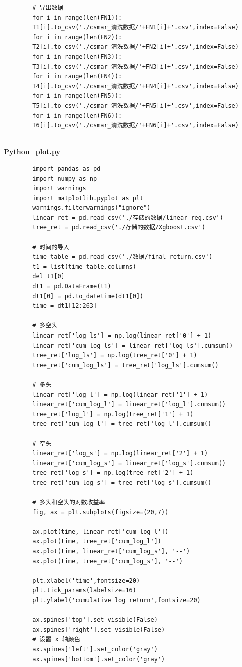 \documentclass[12pt]{article} %
\begin{document}
\begin{lstlisting}
		# 导出数据
		for i in range(len(FN1)):
		T1[i].to_csv('./csmar_清洗数据/'+FN1[i]+'.csv',index=False)
		for i in range(len(FN2)):
		T2[i].to_csv('./csmar_清洗数据/'+FN2[i]+'.csv',index=False)
		for i in range(len(FN3)):
		T3[i].to_csv('./csmar_清洗数据/'+FN3[i]+'.csv',index=False)
		for i in range(len(FN4)):
		T4[i].to_csv('./csmar_清洗数据/'+FN4[i]+'.csv',index=False)
		for i in range(len(FN5)):
		T5[i].to_csv('./csmar_清洗数据/'+FN5[i]+'.csv',index=False)
		for i in range(len(FN6)):
		T6[i].to_csv('./csmar_清洗数据/'+FN6[i]+'.csv',index=False)
	\end{lstlisting}
	~\\
	\textbf{Python\_plot.py}
	\begin{lstlisting}
		import pandas as pd
		import numpy as np
		import warnings
		import matplotlib.pyplot as plt
		warnings.filterwarnings("ignore")
		linear_ret = pd.read_csv('./存储的数据/linear_reg.csv')
		tree_ret = pd.read_csv('./存储的数据/Xgboost.csv')
		
		# 时间的导入
		time_table = pd.read_csv('./数据/final_return.csv')
		t1 = list(time_table.columns)
		del t1[0]
		dt1 = pd.DataFrame(t1)
		dt1[0] = pd.to_datetime(dt1[0])
		time = dt1[12:263]
		
		# 多空头
		linear_ret['log_ls'] = np.log(linear_ret['0'] + 1)
		linear_ret['cum_log_ls'] = linear_ret['log_ls'].cumsum()
		tree_ret['log_ls'] = np.log(tree_ret['0'] + 1)
		tree_ret['cum_log_ls'] = tree_ret['log_ls'].cumsum()
		
		# 多头
		linear_ret['log_l'] = np.log(linear_ret['1'] + 1)
		linear_ret['cum_log_l'] = linear_ret['log_l'].cumsum()
		tree_ret['log_l'] = np.log(tree_ret['1'] + 1)
		tree_ret['cum_log_l'] = tree_ret['log_l'].cumsum()
		
		# 空头
		linear_ret['log_s'] = np.log(linear_ret['2'] + 1)
		linear_ret['cum_log_s'] = linear_ret['log_s'].cumsum()
		tree_ret['log_s'] = np.log(tree_ret['2'] + 1)
		tree_ret['cum_log_s'] = tree_ret['log_s'].cumsum()
		
		# 多头和空头的对数收益率
		fig, ax = plt.subplots(figsize=(20,7))
		
		ax.plot(time, linear_ret['cum_log_l'])
		ax.plot(time, tree_ret['cum_log_l'])
		ax.plot(time, linear_ret['cum_log_s'], '--')
		ax.plot(time, tree_ret['cum_log_s'], '--')
		
		plt.xlabel('time',fontsize=20)
		plt.tick_params(labelsize=16)
		plt.ylabel('cumulative log return',fontsize=20)
		
		ax.spines['top'].set_visible(False) 
		ax.spines['right'].set_visible(False)
		# 设置 x 轴颜色
		ax.spines['left'].set_color('gray')
		ax.spines['bottom'].set_color('gray')
		

\end{lstlisting}
\end{document}

